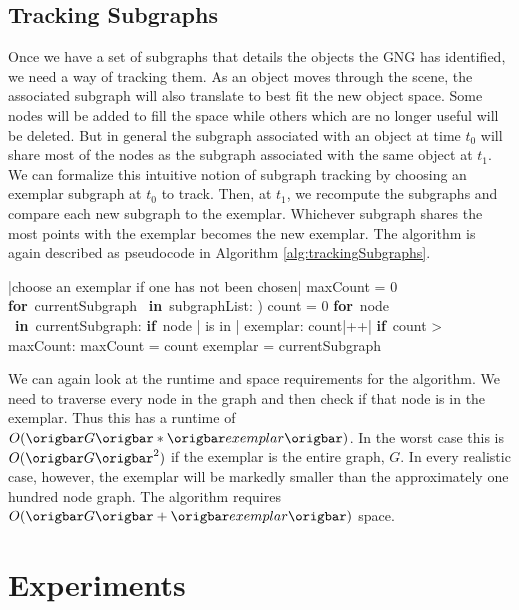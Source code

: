 \documentclass{article}
\renewcommand{\|}{\origbar} %
\renewcommand{\FOR}{\mbox{{\bf for} }\tab}
\renewcommand{\IF}{\mbox{{\bf if} }\tab}
\newcommand{\IN}{\mbox{ {\bf in} }}
\begin{document}
\subsection{Tracking Subgraphs}

Once we have a set of subgraphs that details the objects the GNG has identified, we need a way of tracking them. As an object moves through the scene, the associated subgraph will also translate to best fit the new object space. Some nodes will be added to fill the space while others which are no longer useful will be deleted. But in general the subgraph associated with an object at time $t_0$ will share most of the nodes as the subgraph associated with the same object at $t_1$. We can formalize this intuitive notion of subgraph tracking by choosing an exemplar subgraph at $t_0$ to track. Then, at $t_1$, we recompute the subgraphs and compare each new subgraph to the exemplar. Whichever subgraph shares the most points with the exemplar becomes the new exemplar. The algorithm is again described as pseudocode in Algorithm \ref{alg:trackingSubgraphs}.

\begin{Algorithm}[h!]
\begin{program}
  |choose an exemplar if one has not been chosen|
  maxCount = 0
  \FOR currentSubgraph \IN subgraphList: )
    count = 0
    \FOR node \IN currentSubgraph:
      \IF node | is in | exemplar:
        count|++| \untab \untab
    \IF count > maxCount:
      maxCount = count
      exemplar = currentSubgraph
\end{program}
\caption{Pseudocode for Tracking Subgraphs}
\label{alg:trackingSubgraphs}
\end{Algorithm}

We can again look at the runtime and space requirements for the algorithm. We need to traverse every node in the graph and then check if that node is in the exemplar. Thus this has a runtime of $O(\|G\|*\|exemplar\|)$. In the worst case this is $O(\|G\|^2)$ if the exemplar is the entire graph, $G$. In every realistic case, however, the exemplar will be markedly smaller than the approximately one hundred node graph. The algorithm requires $O(\|G\|+\|exemplar\|)$ space.

\section{Experiments}
\end{document}

